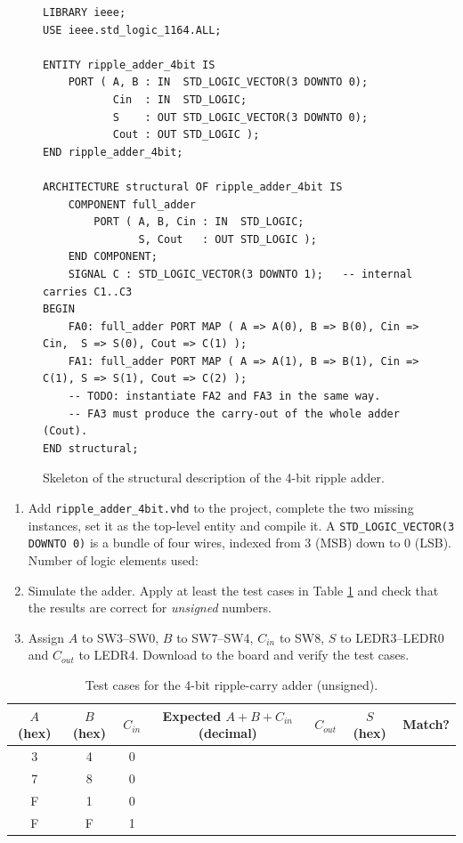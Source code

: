 \documentclass{article}
\begin{document}
\begin{figure}[H]
    \centering
    \begin{verbatim}
LIBRARY ieee;
USE ieee.std_logic_1164.ALL;

ENTITY ripple_adder_4bit IS
    PORT ( A, B : IN  STD_LOGIC_VECTOR(3 DOWNTO 0);
           Cin  : IN  STD_LOGIC;
           S    : OUT STD_LOGIC_VECTOR(3 DOWNTO 0);
           Cout : OUT STD_LOGIC );
END ripple_adder_4bit;

ARCHITECTURE structural OF ripple_adder_4bit IS
    COMPONENT full_adder
        PORT ( A, B, Cin : IN  STD_LOGIC;
               S, Cout   : OUT STD_LOGIC );
    END COMPONENT;
    SIGNAL C : STD_LOGIC_VECTOR(3 DOWNTO 1);   -- internal carries C1..C3
BEGIN
    FA0: full_adder PORT MAP ( A => A(0), B => B(0), Cin => Cin,  S => S(0), Cout => C(1) );
    FA1: full_adder PORT MAP ( A => A(1), B => B(1), Cin => C(1), S => S(1), Cout => C(2) );
    -- TODO: instantiate FA2 and FA3 in the same way.
    -- FA3 must produce the carry-out of the whole adder (Cout).
END structural;
    \end{verbatim}
    \caption{Skeleton of the structural description of the 4-bit ripple adder.}
    \label{fig:ripple_vhdl}
\end{figure}

\begin{enumerate}
    \item Add \texttt{ripple\_adder\_4bit.vhd} to the project, complete the two missing instances, set it as the top-level entity and compile it. A \texttt{STD\_LOGIC\_VECTOR(3 DOWNTO 0)} is a bundle of four wires, indexed from 3 (MSB) down to 0 (LSB). Number of logic elements used: \underline{\hspace{2cm}}
    \item Simulate the adder. Apply at least the test cases in Table \ref{tab:ripple_test} and check that the results are correct for \emph{unsigned} numbers.
    \item Assign $A$ to SW3--SW0, $B$ to SW7--SW4, $C_{in}$ to SW8, $S$ to LEDR3--LEDR0 and $C_{out}$ to LEDR4. Download to the board and verify the test cases.
\end{enumerate}

\begin{table}[H]
    \centering
    \begin{tabular}{|c|c|c|c|c|c|c|}
        \hline
        $A$ (hex) & $B$ (hex) & $C_{in}$ & \textbf{Expected} $A+B+C_{in}$ (decimal) & $C_{out}$ & $S$ (hex) & Match? \\
        \hline
        3 & 4 & 0 & & & & \\
        7 & 8 & 0 & & & & \\
        F & 1 & 0 & & & & \\
        F & F & 1 & & & & \\
        \hline
    \end{tabular}
    \caption{Test cases for the 4-bit ripple-carry adder (unsigned).}
    \label{tab:ripple_test}
\end{table}
\end{document}
